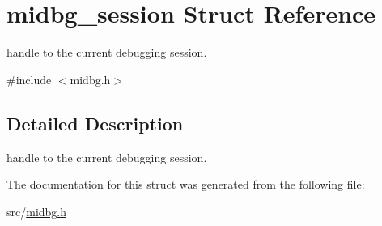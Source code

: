 \hypertarget{structmidbg__session}{\section{midbg\-\_\-session Struct Reference}
\label{structmidbg__session}
}


handle to the current debugging session.  




{\ttfamily \#include $<$midbg.\-h$>$}



\subsection{Detailed Description}
handle to the current debugging session. 

The documentation for this struct was generated from the following file\-:\begin{DoxyCompactItemize}
\item 
src/\hyperlink{midbg_8h}{midbg.\-h}\end{DoxyCompactItemize}
